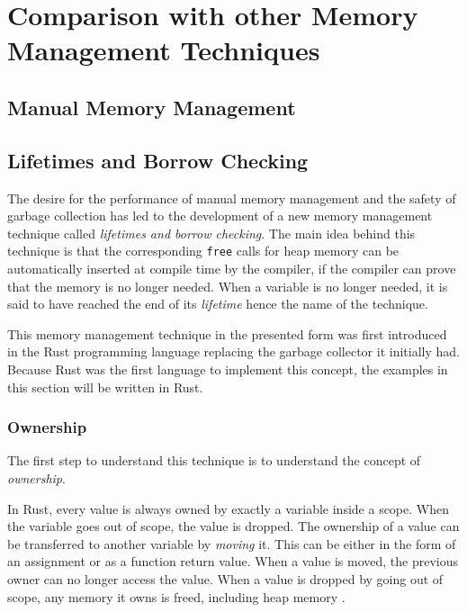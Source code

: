 \chapter{Comparison with other Memory Management Techniques}

\section{Manual Memory Management}

\section{Lifetimes and Borrow Checking}

The desire for the performance of manual memory management and the safety of garbage collection has led to the development
of a new memory management technique called \textit{lifetimes and borrow checking}.
The main idea behind this technique is that the corresponding \texttt{free} calls for heap memory can be automatically inserted
at compile time by the compiler, if the compiler can prove that the memory is no longer needed.
When a variable is no longer needed, it is said to have reached the end of its \textit{lifetime} hence the name of the technique.

This memory management technique in the presented form was first introduced in the Rust programming language
\cite[1. Introduction]{rust_borrow_formalism_2021} replacing the garbage collector it initially had\cite{rust_gc_removal}.
Because Rust was the first language to implement this concept, the examples in this section will be written in Rust.

\subsection{Ownership}

The first step to understand this technique is to understand the concept of \textit{ownership}.

In Rust, every value is always owned by exactly a variable inside a scope.
When the variable goes out of scope, the value is dropped.
The ownership of a value can be transferred to another variable by \textit{moving} it.
This can be either in the form of an assignment or as a function return value.
When a value is moved, the previous owner can no longer access the value.
When a value is dropped by going out of scope, any memory it owns is freed, including heap memory \cite[59-61]{rust_book_2019}.

